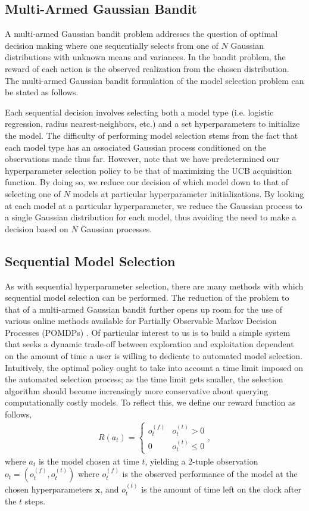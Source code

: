 \documentclass{article}
\newcommand{\x}{\mathbf{x}}
\begin{document}
\subsection{Multi-Armed Gaussian Bandit}
A multi-armed Gaussian bandit problem addresses the question of optimal decision making where one sequentially selects from one of $N$ Gaussian distributions with unknown means and variances. In the bandit problem, the reward of each action is the observed realization from the chosen distribution. The multi-armed Gaussian bandit formulation of the model selection problem can be stated as follows.

Each sequential decision involves selecting both a model type (i.e. logistic regression, radius nearest-neighbors, etc.) and a set hyperparameters to initialize the model. The difficulty of performing model selection stems from the fact that each model type has an associated Gaussian process conditioned on the observations made thus far. However, note that we have predetermined our hyperparameter selection policy to be that of maximizing the UCB acquisition function. By doing so, we reduce our decision of which model down to that of selecting one of $N$ models at particular hyperparameter initializations. By looking at each model at a particular hyperparameter, we reduce the Gaussian process to a single Gaussian distribution for each model, thus avoiding the need to make a decision based on $N$ Gaussian processes.

\subsection{Sequential Model Selection}
As with sequential hyperparameter selection, there are many methods with which sequential model selection can be performed. The reduction of the problem to that of a multi-armed Gaussian bandit further opens up room for the use of various online methods available for Partially Observable Markov Decision Processes (POMDPs) \cite{mykel}. Of particular interest to us is to build a simple system that seeks a dynamic trade-off between exploration and exploitation dependent on the amount of time a user is willing to dedicate to automated model selection. Intuitively, the optimal policy ought to take into account a time limit imposed on the automated selection process; as the time limit gets smaller, the selection algorithm should become increasingly more conservative about querying computationally costly models. To reflect this, we define our reward function as follows,
\begin{align}
  R(a_t) =
  \begin{cases}
    o_t^{(f)} & o^{(t)}_t > 0 \\
    0 & o_t^{(t)} \le 0 
  \end{cases},
\end{align}
where $a_t$ is the model chosen at time $t$, yielding a 2-tuple observation $o_t = (o_t^{(f)}, o_t^{(t)})$ where $o_t^{(f)}$ is the observed performance of the model at the chosen hyperparameters $\x$, and $o_t^{(t)}$ is the amount of time left on the clock after the $t$ steps.
\end{document}
